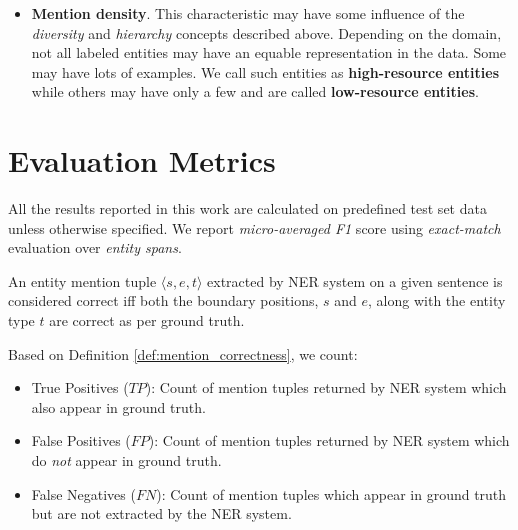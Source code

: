 \begin{itemize}
    \item \textbf{Mention density}. This characteristic may have some influence of the \textit{diversity} and \textit{hierarchy} concepts described above. Depending on the domain, not all labeled entities may have an equable representation in the data. Some may have lots of examples. We call such entities as \textbf{high-resource entities} while others may have only a few and are called \textbf{low-resource entities}.
    
\end{itemize}

\section{Evaluation Metrics}
\label{sec:evaluation_metrics}
All the results reported in this work are calculated on predefined test set data unless otherwise specified. We report \textit{micro-averaged F1} score using \textit{exact-match} evaluation over \textit{entity spans}. 

\begin{definition}
\label{def:mention_correctness}
An entity mention tuple $\langle s, e, t \rangle$ extracted by NER system on a given sentence is considered correct iff both the boundary positions, $s$ and $e$, along with the entity type $t$ are correct as per ground truth.
\end{definition} 

Based on Definition \ref{def:mention_correctness}, we count:

\begin{itemize}
    \item True Positives ($TP$): Count of mention tuples returned by NER system which also appear in ground truth.
    
    \item False Positives ($FP$): Count of mention tuples returned by NER system which do \textit{not} appear in ground truth.
    
    \item False Negatives ($FN$): Count of mention tuples which appear in ground truth but are not extracted by the NER system.
\end{itemize}

